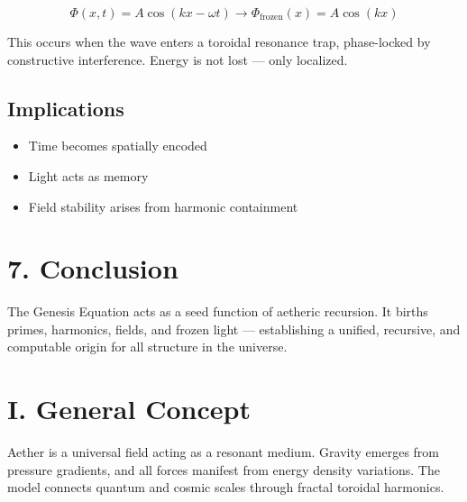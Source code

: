 \[
\Phi(x, t) = A \cos(kx - \omega t) \rightarrow \Phi_{\text{frozen}}(x) = A \cos(kx)
\]

This occurs when the wave enters a toroidal resonance trap, phase-locked by constructive interference. Energy is not lost — only localized.

\subsection*{Implications}

\begin{itemize}
  \item Time becomes spatially encoded
  \item Light acts as memory
  \item Field stability arises from harmonic containment
\end{itemize}

\section*{7. Conclusion}

The Genesis Equation acts as a seed function of aetheric recursion. It births primes, harmonics, fields, and frozen light — establishing a unified, recursive, and computable origin for all structure in the universe.





\maketitle

\section*{I. General Concept}
Aether is a universal field acting as a resonant medium. Gravity emerges from pressure gradients, and all forces manifest from energy density variations. The model connects quantum and cosmic scales through fractal toroidal harmonics.

